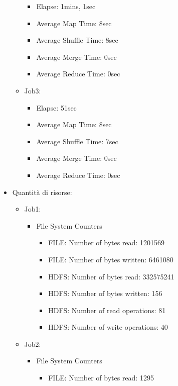 \documentclass[10pt]{article}
\begin{document}
\begin{itemize}
\begin{itemize}
        \begin{itemize}
            \item Elapse: 1mins, 1sec
            \item Average Map Time:	8sec
            \item Average Shuffle Time: 8sec
            \item Average Merge Time: 0sec
            \item Average Reduce Time: 0sec
        \end{itemize}
        \item Job3:
        \begin{itemize}
            \item Elapse: 51sec
            \item Average Map Time:	8sec
            \item Average Shuffle Time: 7sec
            \item Average Merge Time: 0sec
            \item Average Reduce Time: 0sec
        \end{itemize}
    \end{itemize}
    \item Quantità di risorse:
    \begin{itemize}
        \item Job1:
        \begin{itemize}
        \item File System Counters
        \begin{itemize}
            \item FILE: Number of bytes read: 1201569
            \item FILE: Number of bytes written: 6461080
            \item HDFS: Number of bytes read: 332575241
            \item HDFS: Number of bytes written: 156
            \item HDFS: Number of read operations: 81
            \item HDFS: Number of write operations: 40
        \end{itemize}
        \end{itemize}
        \item Job2:
        \begin{itemize}
        \item File System Counters
        \begin{itemize}
            \item FILE: Number of bytes read: 1295

\end{itemize}
\end{itemize}
\end{itemize}
\end{itemize}
\end{document}
